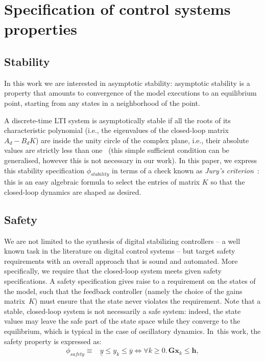 \documentclass[sigconf]{llncs}
\newcommand{\mat}[1]{\boldsymbol{#1}}
\renewcommand{\vec}[1]{\boldsymbol{#1}}
\begin{document}
\section{Specification of control systems properties} 
\label{sec:specification}

\subsection{Stability} 
\label{ssec:stabspecification}

In this work we are interested in asymptotic stability: asymptotic
stability is a property that amounts to convergence of the model
executions to an equilibrium point, starting from any states in a
neighborhood of the point.


A discrete-time LTI system is
asymptotically stable if all the roots of its characteristic
polynomial (i.e., the eigenvalues of the closed-loop matrix $A_d - B_d
K$) are inside the unity circle of the complex plane, i.e., their
absolute values are strictly less than one~\cite{astrom1997computer}
(this simple sufficient condition can be generalised, however this is
not necessary in our work).  In this paper, we express this stability
specification $\phi_\mathit{stability}$ in terms of a check known as
\emph{Jury's criterion}~\cite{fadali}: this is an easy algebraic
formula to select the entries of matrix $K$ so that the closed-loop
dynamics are shaped as desired.

\subsection{Safety} 
\label{ssec:safespecification}

We are not limited to the synthesis of digital stabilizing controllers -- a
well known task in the literature on digital control systems -- but target
safety requirements with an overall approach that is sound and automated. 
More specifically, we require that the closed-loop system meets given safety
specifications.  A safety specification gives raise to a requirement on the
states of the model, such that the feedback controller (namely the choice of
the gains matrix~$K$) must ensure that the state never violates the
requirement.  Note that a stable, closed-loop system is not necessarily a
safe system: indeed, the state values may leave the safe part of the state
space while they converge to the equilibrium, which is typical in the case
of oscillatory dynamics.  In~this work, the safety property is expressed as:
%
\begin{align}
\phi_\mathit{safety}\equiv& \underline{y} \leq y_k \leq \overline{y}
\iff \forall k\geq 0.\, \mat{G}\vec{x}_k \leq \vec{h},
\label{eq:safetyspec}
\end{align}
\end{document}
